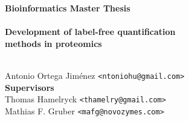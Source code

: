 \documentclass[11pt, a4paper]{report}
\begin{document}
    \thispagestyle{empty}
    \begin{adjustwidth}{-3cm}{-1.5cm}
    \vspace*{-1cm}
    \textbf{\Huge Bioinformatics Master Thesis} \\
    \vspace*{2.5cm} \\
    \textbf{\Huge Development of label-free quantification \\ methods in proteomics} \\
    \vspace*{.1cm} \\
    \begin{tabbing}
    Antonio Ortega Jiménez \hspace{1cm} \= \texttt{<ntoniohu@gmail.com>}
    \\[10.5cm] 
    
    \textbf{\Large Supervisors} \\
    Thomas Hamelryck \> \texttt{<thamelry@gmail.com>} \\
    Mathias F. Gruber \> \texttt{<mafg@novozymes.com>} \\

    \end{tabbing}
    \end{adjustwidth}
    \ClearWallPaper

\setcounter{tocdepth}{2}
\tableofcontents %
\newpage

\thispagestyle{empty}
\printacronyms[include-classes=abbrev,name=Abbreviations]

\newpage
\setcounter{page}{1}

\let\oldthebibliography\thebibliography
\let\endoldthebibliography\endthebibliography
\renewenvironment{thebibliography}[1]{
  \begin{oldthebibliography}{#1}
    \setlength{\itemsep}{0em}
    \setlength{\parskip}{0em}
}
{
  \end{oldthebibliography}
}
\end{document}
